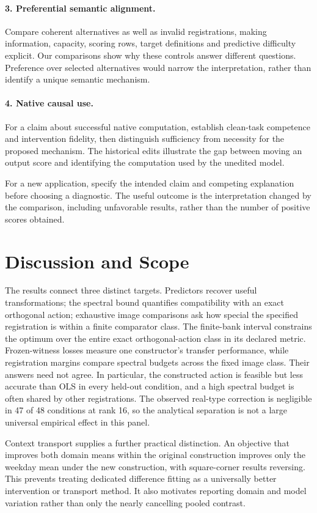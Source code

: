 \documentclass[10pt]{article}
\begin{document}
\paragraph{3. Preferential semantic alignment.}
Compare coherent alternatives as well as invalid registrations, making information, capacity, scoring rows, target definitions and predictive difficulty explicit. Our comparisons show why these controls answer different questions. Preference over selected alternatives would narrow the interpretation, rather than identify a unique semantic mechanism.

\paragraph{4. Native causal use.}
For a claim about successful native computation, establish clean-task competence and intervention fidelity, then distinguish sufficiency from necessity for the proposed mechanism. The historical edits illustrate the gap between moving an output score and identifying the computation used by the unedited model.

For a new application, specify the intended claim and competing explanation before choosing a diagnostic. The useful outcome is the interpretation changed by the comparison, including unfavorable results, rather than the number of positive scores obtained.

\section{Discussion and Scope}
The results connect three distinct targets. Predictors recover useful transformations; the spectral bound quantifies compatibility with an exact orthogonal action; exhaustive image comparisons ask how special the specified registration is within a finite comparator class. The finite-bank interval constrains the optimum over the entire exact orthogonal-action class in its declared metric. Frozen-witness losses measure one constructor's transfer performance, while registration margins compare spectral budgets across the fixed image class. Their answers need not agree. In particular, the constructed action is feasible but less accurate than OLS in every held-out condition, and a high spectral budget is often shared by other registrations. The observed real-type correction is negligible in 47 of 48 conditions at rank 16, so the analytical separation is not a large universal empirical effect in this panel.

Context transport supplies a further practical distinction. An objective that improves both domain means within the original construction improves only the weekday mean under the new construction, with square-corner results reversing. This prevents treating dedicated difference fitting as a universally better intervention or transport method. It also motivates reporting domain and model variation rather than only the nearly cancelling pooled contrast.
\end{document}
